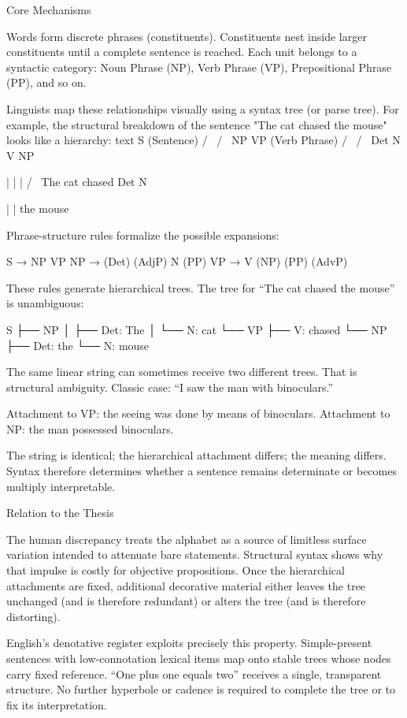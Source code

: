 Core Mechanisms

Words form discrete phrases (constituents). Constituents nest inside larger constituents until a complete sentence is reached. Each unit belongs to a syntactic category: Noun Phrase (NP), Verb Phrase (VP), Prepositional Phrase (PP), and so on.

Linguists map these relationships visually using a syntax tree (or parse tree). For example, the structural breakdown of the sentence "The cat chased the mouse" looks like a hierarchy:
text
          S (Sentence)
         / \
       /     \
     NP       VP (Verb Phrase)
    /  \     /  \
  Det   N   V    NP

   |    |   |   /  \
  The  cat chased Det  N

                   |   |
                  the mouse

Phrase-structure rules formalize the possible expansions:

S → NP VP  
NP → (Det) (AdjP) N (PP)  
VP → V (NP) (PP) (AdvP)  

These rules generate hierarchical trees. The tree for “The cat chased the mouse” is unambiguous:

S
├── NP
│   ├── Det: The
│   └── N: cat
└── VP
    ├── V: chased
    └── NP
        ├── Det: the
        └── N: mouse

The same linear string can sometimes receive two different trees. That is structural ambiguity. Classic case: “I saw the man with binoculars.”

Attachment to VP: the seeing was done by means of binoculars.  
Attachment to NP: the man possessed binoculars.  

The string is identical; the hierarchical attachment differs; the meaning differs. Syntax therefore determines whether a sentence remains determinate or becomes multiply interpretable.

Relation to the Thesis

The human discrepancy treats the alphabet as a source of limitless surface variation intended to attenuate bare statements. Structural syntax shows why that impulse is costly for objective propositions. Once the hierarchical attachments are fixed, additional decorative material either leaves the tree unchanged (and is therefore redundant) or alters the tree (and is therefore distorting).

English’s denotative register exploits precisely this property. Simple-present sentences with low-connotation lexical items map onto stable trees whose nodes carry fixed reference. “One plus one equals two” receives a single, transparent structure. No further hyperbole or cadence is required to complete the tree or to fix its interpretation.

